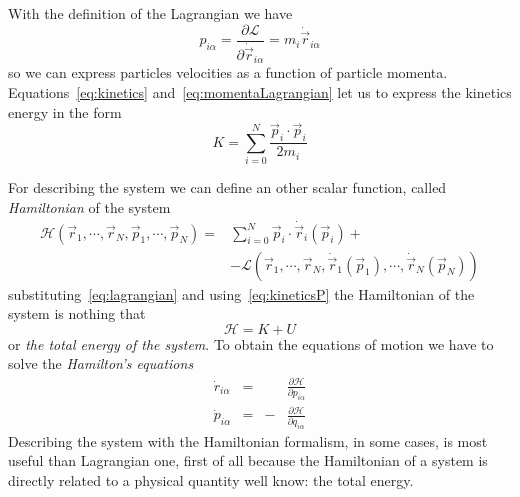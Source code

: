 With the definition of the Lagrangian we have
\begin{equation}
	p_{i\alpha} = \frac{\partial\mathcal{L}}{\partial \dot{\vec r}_{i\alpha}} = m_i\dot{\vec r}_{i\alpha}
	\label{eq:momentaLagrangian}
\end{equation}
so we can express particles velocities as a function of particle momenta. Equations~\eqref{eq:kinetics} and~\eqref{eq:momentaLagrangian} let us to express the kinetics energy in the form
\begin{equation}
	K = \sum_{i=0}^N \frac{\vec p_i \cdot \vec p_i}{2m_i}
	\label{eq:kineticsP}
\end{equation}

For describing the system we can define an other scalar function, called \textit{Hamiltonian} of the system
\begin{align}
	\mathcal{H}(\vec r_1,\cdots,\vec r_N, \vec p_1, \cdots, \vec p_N) = &\sum_{i=0}^N \vec p_i \cdot \dot{\vec r}_i(\vec p_i) + \nonumber \\
	&-\mathcal{L}(\vec r_1, \cdots, \vec r_N, \dot{\vec r}_1(\vec p_1),\cdots,\dot{\vec r}_N(\vec p_N))
\end{align}
substituting~\eqref{eq:lagrangian} and using~\eqref{eq:kineticsP} the Hamiltonian of the system is nothing that
\begin{equation}
	\mathcal{H} = K + U
\end{equation}
or \textit{the total energy of the system}. To obtain the equations of motion we have to solve the \textit{Hamilton's equations}
\begin{equation*}
	\begin{aligned}
		\dot r_{i\alpha} &=& &\frac{\partial\mathcal{H}}{\partial p_{i\alpha}} \\
		\dot p_{i\alpha} &=&-&\frac{\partial\mathcal{H}}{\partial q_{i\alpha}}
	\end{aligned}
\end{equation*}
Describing the system with the Hamiltonian formalism, in some cases, is most useful than Lagrangian one, first of all because the Hamiltonian of a system is directly related to a physical quantity well know: the total energy.


